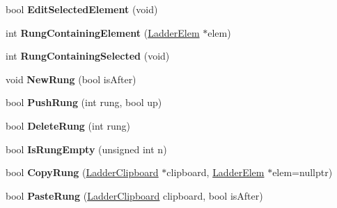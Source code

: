 \begin{DoxyCompactItemize}
\item 
\hypertarget{class_ladder_diagram_a61a00bd5e550aa59f85b401120094f0e}{bool {\bfseries Edit\-Selected\-Element} (void)}\label{class_ladder_diagram_a61a00bd5e550aa59f85b401120094f0e}

\item 
\hypertarget{class_ladder_diagram_aef213a13bf9d7eaf778b5bfe76418974}{int {\bfseries Rung\-Containing\-Element} (\hyperlink{class_ladder_elem}{Ladder\-Elem} $\ast$elem)}\label{class_ladder_diagram_aef213a13bf9d7eaf778b5bfe76418974}

\item 
\hypertarget{class_ladder_diagram_a5c38ecbe315616be46ad1585f29fbe4d}{int {\bfseries Rung\-Containing\-Selected} (void)}\label{class_ladder_diagram_a5c38ecbe315616be46ad1585f29fbe4d}

\item 
\hypertarget{class_ladder_diagram_a70ba44a2817eb1de16a2a76ae35ebe7e}{void {\bfseries New\-Rung} (bool is\-After)}\label{class_ladder_diagram_a70ba44a2817eb1de16a2a76ae35ebe7e}

\item 
\hypertarget{class_ladder_diagram_a3bc782d74d99e72316c7b359fad53eb4}{bool {\bfseries Push\-Rung} (int rung, bool up)}\label{class_ladder_diagram_a3bc782d74d99e72316c7b359fad53eb4}

\item 
\hypertarget{class_ladder_diagram_a12bd1188b326ac796bddf37cc4c646c6}{bool {\bfseries Delete\-Rung} (int rung)}\label{class_ladder_diagram_a12bd1188b326ac796bddf37cc4c646c6}

\item 
\hypertarget{class_ladder_diagram_af8dacae346f30fb5a62f49e4a6d59200}{bool {\bfseries Is\-Rung\-Empty} (unsigned int n)}\label{class_ladder_diagram_af8dacae346f30fb5a62f49e4a6d59200}

\item 
\hypertarget{class_ladder_diagram_a135c7db7b98011cf10700c75fbd0f397}{bool {\bfseries Copy\-Rung} (\hyperlink{struct_ladder_clipboard}{Ladder\-Clipboard} $\ast$clipboard, \hyperlink{class_ladder_elem}{Ladder\-Elem} $\ast$elem=nullptr)}\label{class_ladder_diagram_a135c7db7b98011cf10700c75fbd0f397}

\item 
\hypertarget{class_ladder_diagram_a5529eff9bc9e0c97cf6c66c3dcbfc519}{bool {\bfseries Paste\-Rung} (\hyperlink{struct_ladder_clipboard}{Ladder\-Clipboard} clipboard, bool is\-After)}\label{class_ladder_diagram_a5529eff9bc9e0c97cf6c66c3dcbfc519}


\end{DoxyCompactItemize}
